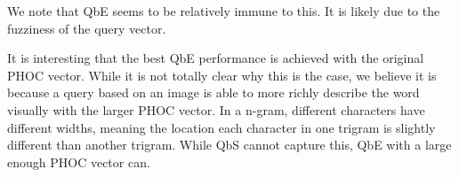 \documentclass[ms,electronic,twosidetoc,letterpaper,chaptercenter,parttop,lof,lot]{byumsphd}
\begin{document}
We note that QbE seems to be relatively immune to this. It is likely due to the fuzziness of the query vector.


It is interesting that the best QbE performance is achieved with the original PHOC vector. While it is not totally clear why this is the case, we believe it is because a query based on an image is able to more richly describe the word visually with the larger PHOC vector. In a n-gram, different characters have different widths, meaning the location each character in one trigram is slightly different than another trigram. While QbS cannot capture this, QbE with a large enough PHOC vector can.


\end{document}
